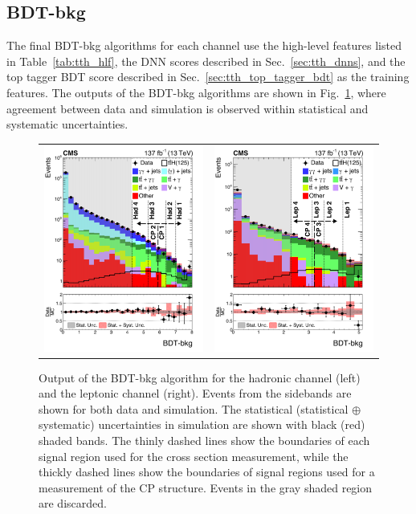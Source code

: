 \subsection{BDT-bkg}
The final BDT-bkg algorithms for each channel use the high-level features listed in Table~\ref{tab:tth_hlf}, the DNN scores described in Sec.~\ref{sec:tth_dnns}, and the top tagger BDT score described in Sec.~\ref{sec:tth_top_tagger_bdt} as the training features.
The outputs of the BDT-bkg algorithms are shown in Fig.~\ref{fig:tth_bdt-bkg}, where agreement between data and simulation is observed within statistical and systematic uncertainties.
\begin{figure} [htbp!]
    \centering
    \begin{tabular}{c c}
        \includegraphics[width=0.48\linewidth]{figures/tth/CMS-HIG-19-013_Figure_001-a.png} &
        \includegraphics[width=0.48\linewidth]{figures/tth/CMS-HIG-19-013_Figure_001-b.png}
    \end{tabular}
    \caption{Output of the BDT-bkg algorithm for the hadronic channel (left) and the leptonic channel (right). Events from the \mgg sidebands are shown for both data and simulation. The statistical (statistical $\oplus$ systematic) uncertainties in simulation are shown with black (red) shaded bands. The thinly dashed lines show the boundaries of each signal region used for the cross section measurement, while the thickly dashed lines show the boundaries of signal regions used for a measurement of the CP structure. Events in the gray shaded region are discarded.}
    \label{fig:tth_bdt-bkg}
\end{figure}


